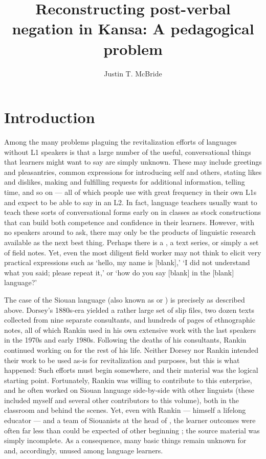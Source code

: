 \documentclass[output=paper]{LSP/langsci}
\author{Justin T. McBride}
\title{Reconstructing post-verbal negation in {Kansa}: {A} pedagogical problem}
\begin{document}
\section{Introduction}
Among the many problems plaguing the revitalization efforts of languages without L1 speakers is that a large number of the useful, conversational things that learners might want to say are simply unknown. These may include greetings and pleasantries, common expressions for introducing self and others, stating likes and dislikes, making and fulfilling requests for additional information, telling time, and so on --- all of which people use with great frequency in their own L1s and expect to be able to say in an L2. In fact, language teachers usually want to teach these sorts of conversational forms early on in classes as stock constructions that can build both competence and confidence in their learners. However, with no speakers around to ask, there may only be the products of linguistic research available as the next best thing. Perhaps there is a , a text series, or simply a set of field notes. Yet, even the most diligent field worker may not think to elicit very practical expressions such as `hello, my name is [blank],' `I did not understand what you said; please repeat it,' or `how do you say [blank] in the [blank] language?' 

The case of the  Siouan language  (also known as  or ) is precisely as described above. Dorsey's 1880s-era  yielded a rather large set of slip files, two dozen texts collected from nine separate consultants, and hundreds of pages of ethnographic notes, all of which Rankin used in his own extensive work with the last  speakers in the 1970s and early 1980s. Following the deaths of his consultants, Rankin continued working on  for the rest of his life. Neither Dorsey nor Rankin intended their work to be used as-is for revitalization and  purposes, but this is what happened: Such efforts must begin somewhere, and their material was the logical starting point. Fortunately, Rankin was willing to contribute to this enterprise, and he often worked on Siouan language  side-by-side with other linguists (these included myself and several other contributors to this volume), both in the classroom and behind the scenes. Yet, even with Rankin --- himself a lifelong educator --- and a team of Siouanists at the head of  , the learner outcomes were often far less than could be expected of other beginning ; the source material was simply incomplete. As a consequence, many basic things remain unknown for  and, accordingly, unused among language learners.
 
\end{document}
